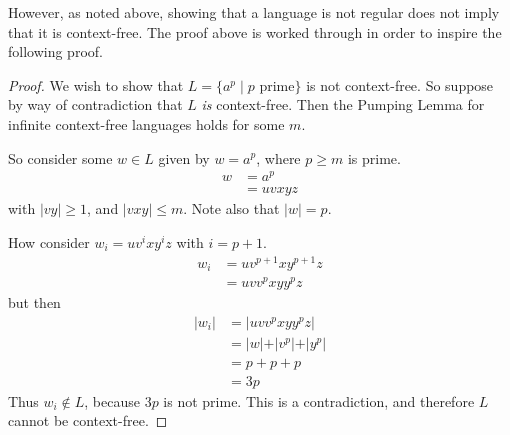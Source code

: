 \documentclass{article}
\begin{document}
However, as noted above, showing that a language is not regular does not imply that it is context-free.
The proof above is worked through in order to inspire the following proof.

\begin{proof}
    We wish to show that $L = \{a^p \mid p \text{ prime}\}$ is not context-free.
    So suppose by way of contradiction that $L$ \textit{is} context-free.
    Then the Pumping Lemma for infinite context-free languages holds for some $m$.

    So consider some $w \in L$ given by $w = a^p$, where $p \geq m$ is prime.
    \begin{align*}
        w & = a^p   \\
          & = uvxyz
    \end{align*}
    with $\vert vy \vert \geq 1$, and $\vert vxy \vert \leq m$.
    Note also that $\vert w \vert = p$.

    How consider $w_i = u v^i x y^i z$ with $i = p + 1$.
    \begin{align*}
        w_i & = u v^{p + 1} x y^{p + 1} z \\
            & = u v v^p x y y^p z
    \end{align*}
    but then
    \begin{align*}
        \vert w_i \vert & = \vert u v v^p x y y^p z \vert                     \\
                        & = \vert w \vert + \vert v^p \vert + \vert y^p \vert \\
                        & = p + p + p                                         \\
                        & = 3p
    \end{align*}
    Thus $w_i \notin L$, because $3p$ is not prime.
    This is a contradiction, and therefore $L$ cannot be context-free.
\end{proof}
\end{document}
